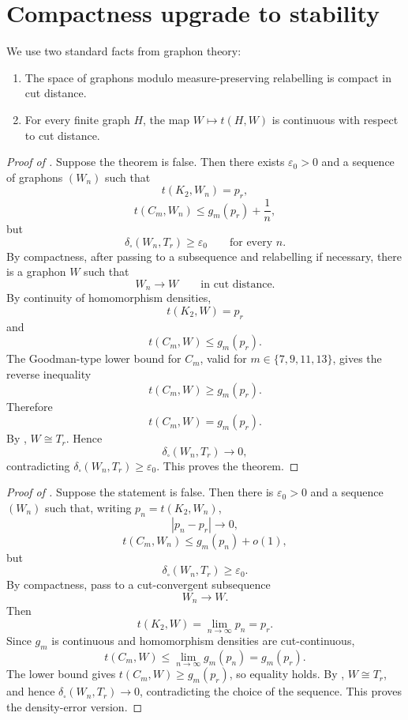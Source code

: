 \documentclass[11pt]{article}
\newcommand{\cutdist}{\delta_{\square}}
\begin{document}
\section{Compactness upgrade to stability}

We use two standard facts from graphon theory:
\begin{enumerate}[label=(\alph*)]
\item The space of graphons modulo measure-preserving relabelling is compact in
cut distance.
\item For every finite graph \(H\), the map \(W\mapsto t(H,W)\) is continuous
with respect to cut distance.
\end{enumerate}

\begin{proof}[Proof of ]
Suppose the theorem is false.  Then there exists \(\varepsilon_0>0\) and a
sequence of graphons \((W_n)\) such that
\[
        t(K_2,W_n)=p_r,
\]
\[
        t(C_m,W_n)\le g_m(p_r)+\frac1n,
\]
but
\[
        \cutdist(W_n,T_r)\ge\varepsilon_0
        \qquad\text{for every }n.
\]
By compactness, after passing to a subsequence and relabelling if necessary,
there is a graphon \(W\) such that
\[
        W_n\to W
        \qquad\text{in cut distance}.
\]
By continuity of homomorphism densities,
\[
        t(K_2,W)=p_r
\]
and
\[
        t(C_m,W)\le g_m(p_r).
\]
The Goodman-type lower bound for \(C_m\), valid for
\(m\in\{7,9,11,13\}\), gives the reverse inequality
\[
        t(C_m,W)\ge g_m(p_r).
\]
Therefore
\[
        t(C_m,W)=g_m(p_r).
\]
By , \(W\cong T_r\).  Hence
\[
        \cutdist(W_n,T_r)\to0,
\]
contradicting \(\cutdist(W_n,T_r)\ge\varepsilon_0\).  This proves the theorem.
\end{proof}

\begin{proof}[Proof of ]
Suppose the statement is false.  Then there is \(\varepsilon_0>0\) and a
sequence \((W_n)\) such that, writing \(p_n=t(K_2,W_n)\),
\[
        |p_n-p_r|\to0,
\]
\[
        t(C_m,W_n)\le g_m(p_n)+o(1),
\]
but
\[
        \cutdist(W_n,T_r)\ge\varepsilon_0.
\]
By compactness, pass to a cut-convergent subsequence
\[
        W_n\to W.
\]
Then
\[
        t(K_2,W)=\lim_{n\to\infty}p_n=p_r.
\]
Since \(g_m\) is continuous and homomorphism densities are cut-continuous,
\[
        t(C_m,W)\le \lim_{n\to\infty}g_m(p_n)=g_m(p_r).
\]
The lower bound gives \(t(C_m,W)\ge g_m(p_r)\), so equality holds.  By
, \(W\cong T_r\), and hence
\(\cutdist(W_n,T_r)\to0\), contradicting the choice of the sequence.  This
proves the density-error version.
\end{proof}
\end{document}
